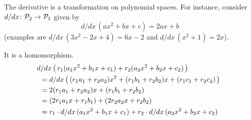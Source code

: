 \begin{frame}
\ex
The derivative is a transformation on polynomial spaces.
For instance, consider
$\mbox{$d/dx\colon \mathcal{P}_2\to \mathcal{P}_1$}$
given by
\begin{equation*}
  d/dx\,(ax^2+bx+c)=2ax+b
\end{equation*}
(examples are $d/dx\,(3x^2-2x+4)=6x-2$
and $d/dx\,(x^2+1)=2x$).

It is a homomorphism.
\begin{multline*}
  d/dx\,\big(\,r_1(a_1x^2+b_1x+c_1)+r_2(a_2x^2+b_2x+c_2)\,\big)  \hspace*{5em}  \\
  \begin{aligned} 
    &=d/dx\,\big(\,(r_1a_1+r_2a_2)x^2+(r_1b_1+r_2b_2)x+(r_1c_1+r_2c_2)\,\big)   \\
    &=2(r_1a_1+r_2a_2)x+(r_1b_1+r_2b_2)   \\
    &=(2r_1a_1x+r_1b_1)+(2r_2a_2x+r_2b_2)   \\
    &=r_1\cdot d/dx\,(a_1x^2+b_1x+c_1)
      +r_2\cdot d/dx\,(a_2x^2+b_2x+c_2)
  \end{aligned}
\end{multline*}
\end{frame}



